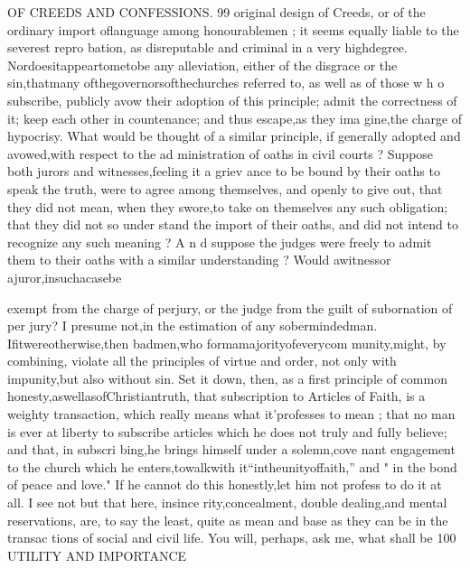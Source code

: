 \documentclass[
]{book}
\begin{document}
OF CREEDS AND CONFESSIONS. 99
original design of Creeds, or of the ordinary import oflanguage among honourablemen ; it seems equally liable to the severest repro bation, as disreputable and criminal in a very
highdegree. Nordoesitappeartometobe any alleviation, either of the disgrace or the
sin,thatmany ofthegovernorsofthechurches
referred to, as well as of those w h o subscribe,
publicly avow their adoption of this principle;
admit the correctness of it; keep each other
in countenance; and thus escape,as they ima
gine,the charge of hypocrisy. What would
be thought of a similar principle, if generally adopted and avowed,with respect to the ad
ministration of oaths in civil courts ? Suppose both jurors and witnesses,feeling it a griev ance to be bound by their oaths to speak the truth, were to agree among themselves, and openly to give out, that they did not mean, when they swore,to take on themselves any such obligation; that they did not so under
stand the import of their oaths, and did not intend to recognize any such meaning ? A n d suppose the judges were freely to admit them to their oaths with a similar understanding ? Would awitnessor ajuror,insuchacasebe

exempt from the charge of perjury, or the
judge from the guilt of subornation of per
jury? I presume not,in the estimation of any sobermindedman. Ifitwereotherwise,then
badmen,who formamajorityofeverycom munity,might, by combining, violate all the
principles of virtue and order, not only with impunity,but also without sin.
Set it down, then, as a first principle of common honesty,aswellasofChristiantruth,
that subscription to Articles of Faith, is a
weighty transaction, which really means what
it'professes to mean ; that no man is ever at
liberty to subscribe articles which he does not
truly and fully believe; and that, in subscri
bing,he brings himself under a solemn,cove nant engagement to the church which he
enters,towalkwith it``intheunityoffaith,''
and " in the bond of peace and love." If he cannot do this honestly,let him not profess to do it at all. I see not but that here, insince rity,concealment, double dealing,and mental reservations, are, to say the least, quite as mean and base as they can be in the transac tions of social and civil life.
You will, perhaps, ask me, what shall be
100 UTILITY AND IMPORTANCE
\end{document}
